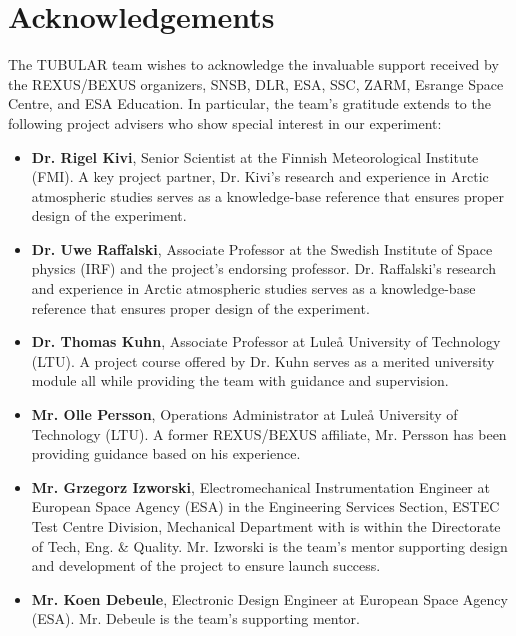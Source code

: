 \section*{Acknowledgements} \markboth{}{}

The TUBULAR team wishes to acknowledge the invaluable support received by the REXUS/BEXUS organizers, SNSB, DLR, ESA, SSC, ZARM, Esrange Space Centre, and ESA Education. In particular, the team's gratitude extends to the following project advisers who show special interest in our experiment:

\begin{itemize}
  \item \textbf{Dr. Rigel Kivi}, Senior Scientist at the Finnish Meteorological Institute (FMI). A key project partner, Dr. Kivi's research and experience in Arctic atmospheric studies serves as a knowledge-base reference that ensures proper design of the experiment.
  \item \textbf{Dr. Uwe Raffalski}, Associate Professor at the Swedish Institute of Space physics (IRF) and the project's endorsing professor. Dr. Raffalski's research and experience in Arctic atmospheric studies serves as a knowledge-base reference that ensures proper design of the experiment.
  \item \textbf{Dr. Thomas Kuhn}, Associate Professor at Luleå  University of Technology (LTU). A project course offered by Dr. Kuhn serves as a merited university module all while providing the team with guidance and supervision.
  \item \textbf{Mr. Olle Persson}, Operations Administrator at Luleå University of Technology (LTU). A former REXUS/BEXUS affiliate, Mr. Persson has been providing guidance based on his experience.
  \item \textbf{Mr. Grzegorz Izworski}, Electromechanical Instrumentation Engineer at European Space Agency (ESA) in the Engineering Services Section, ESTEC Test Centre Division, Mechanical Department with is within the Directorate of Tech, Eng. & Quality. Mr. Izworski is the team's mentor supporting design and development of the project to ensure launch success.
  \item \textbf{Mr. Koen Debeule}, Electronic Design Engineer at European Space Agency (ESA). Mr. Debeule is the team's supporting mentor.
\end{itemize}
